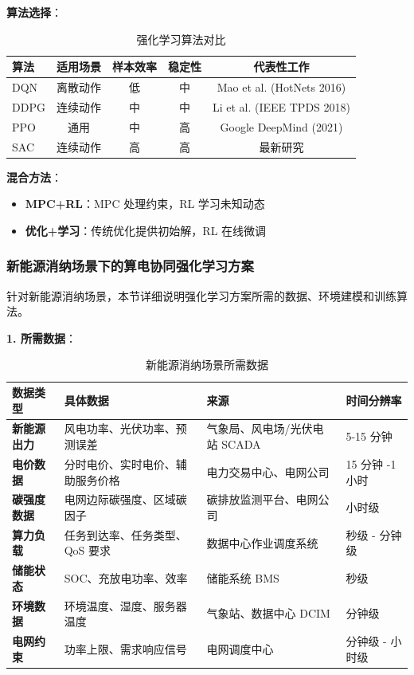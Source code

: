 \documentclass[12pt,a4paper]{article}
\begin{document}
\textbf{算法选择}：
\begin{table}[h]
\centering
\caption{强化学习算法对比}
\label{tab:rl-algo-compare}
\begin{tabular}{@{}lcccc@{}}
\toprule
\textbf{算法} & \textbf{适用场景} & \textbf{样本效率} & \textbf{稳定性} & \textbf{代表性工作} \\
\midrule
DQN & 离散动作 & 低 & 中 & Mao et al. (HotNets 2016) \\
DDPG & 连续动作 & 中 & 中 & Li et al. (IEEE TPDS 2018) \\
PPO & 通用 & 中 & 高 & Google DeepMind (2021) \\
SAC & 连续动作 & 高 & 高 & 最新研究 \\
\bottomrule
\end{tabular}
\end{table}

\textbf{混合方法}：
\begin{itemize}
    \item \textbf{MPC+RL}：MPC 处理约束，RL 学习未知动态
    \item \textbf{优化+学习}：传统优化提供初始解，RL 在线微调
\end{itemize}

\subsubsection{新能源消纳场景下的算电协同强化学习方案}

针对新能源消纳场景，本节详细说明强化学习方案所需的数据、环境建模和训练算法。

\textbf{1. 所需数据}：

\begin{table}[h]
\centering
\caption{新能源消纳场景所需数据}
\label{tab:re-data-requirements}
\begin{tabular}{@{}p{3cm}p{4cm}p{4cm}p{3cm}@{}}
\toprule
\textbf{数据类型} & \textbf{具体数据} & \textbf{来源} & \textbf{时间分辨率} \\
\midrule
\textbf{新能源出力} & 风电功率、光伏功率、预测误差 & 气象局、风电场/光伏电站 SCADA & 5-15 分钟 \\
\textbf{电价数据} & 分时电价、实时电价、辅助服务价格 & 电力交易中心、电网公司 & 15 分钟 -1 小时 \\
\textbf{碳强度数据} & 电网边际碳强度、区域碳因子 & 碳排放监测平台、电网公司 & 小时级 \\
\textbf{算力负载} & 任务到达率、任务类型、QoS 要求 & 数据中心作业调度系统 & 秒级 - 分钟级 \\
\textbf{储能状态} & SOC、充放电功率、效率 & 储能系统 BMS & 秒级 \\
\textbf{环境数据} & 环境温度、湿度、服务器温度 & 气象站、数据中心 DCIM & 分钟级 \\
\textbf{电网约束} & 功率上限、需求响应信号 & 电网调度中心 & 分钟级 - 小时级 \\
\bottomrule
\end{tabular}
\end{table}
\end{document}
